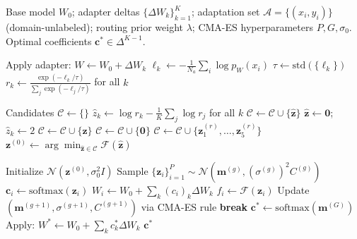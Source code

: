\documentclass[preprint,12pt]{elsarticle}
\begin{document}
\begin{algorithm}[H] %
\caption{SPECTRA Adaptation Procedure}
\label{alg:spectra}
\begin{algorithmic}[1]
\Require Base model $W_0$; adapter deltas $\{\Delta W_k\}_{k=1}^K$;
         adaptation set $\mathcal{A} = \{(x_i, y_i)\}$ (domain-unlabeled);
         routing prior weight $\lambda$; CMA-ES hyperparameters $P, G, \sigma_0$.
\Ensure Optimal coefficients $\mathbf{c}^* \in \Delta^{K-1}$.

\State {}
    \State Apply adapter: $W \leftarrow W_0 + \Delta W_k$
    \State $\ell_k \leftarrow -\frac{1}{N_a}\sum_i \log p_W(x_i)$
\EndFor
\State $\tau \leftarrow \mathrm{std}(\{\ell_k\})$
\State $r_k \leftarrow \frac{\exp(-\ell_k/\tau)}{\sum_j \exp(-\ell_j/\tau)}$ for all $k$

\State {}
\State Candidates $\mathcal{C} \leftarrow \{\}$
\State $\hat{z}_k \leftarrow \log r_k - \frac{1}{K}\sum_j \log r_j$ for all $k$
\State $\mathcal{C} \leftarrow \mathcal{C} \cup \{\hat{\mathbf{z}}\}$
    \State $\hat{\mathbf{z}} \leftarrow \mathbf{0}$; $\hat{z}_k \leftarrow 2$
    \State $\mathcal{C} \leftarrow \mathcal{C} \cup \{\hat{\mathbf{z}}\}$
\EndFor
\State $\mathcal{C} \leftarrow \mathcal{C} \cup \{\mathbf{0}\}$
\State $\mathcal{C} \leftarrow \mathcal{C} \cup \{\mathbf{z}^{(r)}_1,\ldots,\mathbf{z}^{(r)}_5\}$
\State $\mathbf{z}^{(0)} \leftarrow \arg\min_{\hat{\mathbf{z}} \in \mathcal{C}} \mathcal{F}(\hat{\mathbf{z}})$

\State {}
\State Initialize $\mathcal{N}(\mathbf{z}^{(0)}, \sigma_0^2 I)$
    \State Sample $\{\mathbf{z}_i\}_{i=1}^P \sim \mathcal{N}(\mathbf{m}^{(g)}, (\sigma^{(g)})^2 C^{(g)})$
        \State $\mathbf{c}_i \leftarrow \mathrm{softmax}(\mathbf{z}_i)$
        \State $W_i \leftarrow W_0 + \sum_k (c_i)_k \Delta W_k$
        \State $f_i \leftarrow \mathcal{F}(\mathbf{z}_i)$
    \EndFor
    \State Update $(\mathbf{m}^{(g+1)}, \sigma^{(g+1)}, C^{(g+1)})$ via CMA-ES rule
        \textbf{break}
    \EndIf
\EndFor
\State $\mathbf{c}^* \leftarrow \mathrm{softmax}(\mathbf{m}^{(G)})$
\State Apply: $W^* \leftarrow W_0 + \sum_k c_k^* \Delta W_k$
\Return $\mathbf{c}^*$
\end{algorithmic}
\end{algorithm}
\end{document}
